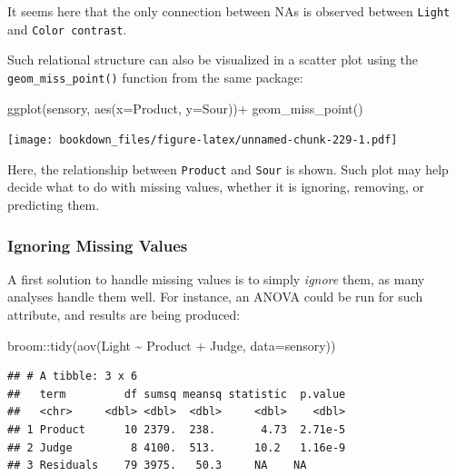 \documentclass[
]{krantz}
\makeatletter
\newenvironment{Shaded}{\begin{snugshade}}{\end{snugshade}}
\newcommand{\AttributeTok}[1]{\textcolor[rgb]{0.61,0.61,0.61}{#1}}
\newcommand{\FunctionTok}[1]{\textcolor[rgb]{0,0,0}{#1}}
\newcommand{\NormalTok}[1]{#1}
\newcommand{\SpecialCharTok}[1]{\textcolor[rgb]{0,0,0}{#1}}
\newenvironment{kframe}{%
\medskip{}
\setlength{\fboxsep}{.8em}
 \def\at@end@of@kframe{}%
 \ifinner\ifhmode%
  \def\at@end@of@kframe{\end{minipage}}%
  \begin{minipage}{\columnwidth}%
 \fi\fi%
 \def\FrameCommand##1{\hskip\@totalleftmargin \hskip-\fboxsep
 \colorbox{shadecolor}{##1}\hskip-\fboxsep
     \hskip-\linewidth \hskip-\@totalleftmargin \hskip\columnwidth}%
 \MakeFramed {\advance\hsize-\width
   \@totalleftmargin\z@ \linewidth\hsize
   \@setminipage}}%
 {\par\unskip\endMakeFramed%
 \at@end@of@kframe}
\renewenvironment{Shaded}{\begin{kframe}}{\end{kframe}}
\makeatother
\begin{document}
It seems here that the only connection between NAs is observed between \texttt{Light} and \texttt{Color\ contrast}.

Such relational structure can also be visualized in a scatter plot using the \texttt{geom\_miss\_point()} function from the same package:

\begin{Shaded}
\begin{Highlighting}[]
\FunctionTok{ggplot}\NormalTok{(sensory, }\FunctionTok{aes}\NormalTok{(}\AttributeTok{x=}\NormalTok{Product, }\AttributeTok{y=}\NormalTok{Sour))}\SpecialCharTok{+}
  \FunctionTok{geom\_miss\_point}\NormalTok{()}
\end{Highlighting}
\end{Shaded}

\texttt{[image: bookdown\_files/figure-latex/unnamed-chunk-229-1.pdf]}

Here, the relationship between \texttt{Product} and \texttt{Sour} is shown. Such plot may help decide what to do with missing values, whether it is ignoring, removing, or predicting them.

\hypertarget{ignoring-missing-values}{%
\subsubsection{Ignoring Missing Values}\label{ignoring-missing-values}}

A first solution to handle missing values is to simply \emph{ignore} them, as many analyses handle them well. For instance, an ANOVA could be run for such attribute, and results are being produced:

\begin{Shaded}
\begin{Highlighting}[]
\NormalTok{broom}\SpecialCharTok{::}\FunctionTok{tidy}\NormalTok{(}\FunctionTok{aov}\NormalTok{(Light }\SpecialCharTok{\textasciitilde{}}\NormalTok{ Product }\SpecialCharTok{+}\NormalTok{ Judge, }\AttributeTok{data=}\NormalTok{sensory))}
\end{Highlighting}
\end{Shaded}

\begin{verbatim}
## # A tibble: 3 x 6
##   term         df sumsq meansq statistic  p.value
##   <chr>     <dbl> <dbl>  <dbl>     <dbl>    <dbl>
## 1 Product      10 2379.  238.       4.73  2.71e-5
## 2 Judge         8 4100.  513.      10.2   1.16e-9
## 3 Residuals    79 3975.   50.3     NA    NA
\end{verbatim}
\end{document}
